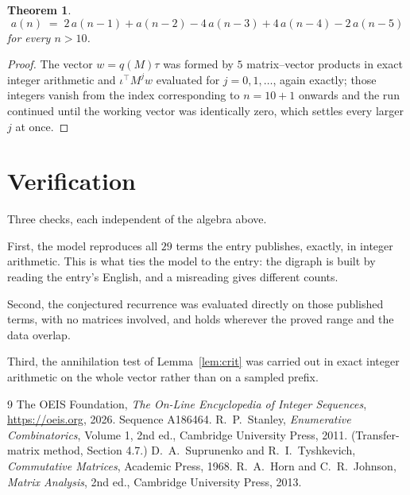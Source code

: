 \documentclass[11pt,a4paper]{article}
\theoremstyle{plain}
\newtheorem{theorem}{Theorem}
\theoremstyle{definition}
\begin{document}
\begin{theorem}
\[
a(n)\;=\;2\,a(n-1) + a(n-2) - 4\,a(n-3) + 4\,a(n-4) - 2\,a(n-5)
\]
for every $n>10$.
\end{theorem}

\begin{proof}
The vector $w=q(M)\tau$ was formed by $5$ matrix--vector products in exact integer
arithmetic and $\iota^{\!\top}M^{j}w$ evaluated for $j=0,1,\dots$, again exactly; those
integers vanish from the index corresponding to $n=10+1$ onwards and the run continued
until the working vector was identically zero, which settles every larger $j$ at once.
\end{proof}

\section{Verification}

Three checks, each independent of the algebra above.

First, the model reproduces all $29$ terms the entry publishes, exactly, in integer
arithmetic. This is what ties the model to the entry: the digraph is built by reading the
entry's English, and a misreading gives different counts.

Second, the conjectured recurrence was evaluated directly on those published terms, with no
matrices involved, and holds wherever the proved range and the data overlap.

Third, the annihilation test of Lemma~\ref{lem:crit} was carried out in exact integer
arithmetic on the whole vector rather than on a sampled prefix.

\begin{thebibliography}{9}
 The OEIS Foundation, \emph{The On-Line Encyclopedia of Integer
Sequences}, \url{https://oeis.org}, 2026. Sequence A186464.
 R.~P.~Stanley, \emph{Enumerative Combinatorics}, Volume 1, 2nd ed.,
Cambridge University Press, 2011. (Transfer-matrix method, Section 4.7.)
 D.~A.~Suprunenko and R.~I.~Tyshkevich, \emph{Commutative Matrices},
Academic Press, 1968.
 R.~A.~Horn and C.~R.~Johnson, \emph{Matrix Analysis}, 2nd ed., Cambridge
University Press, 2013.
\end{thebibliography}
\end{document}
